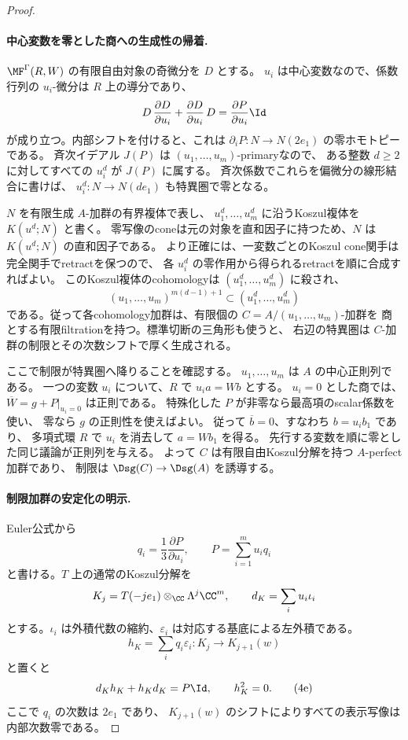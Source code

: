 \begin{proof}
 \paragraph{中心変数を零とした商への生成性の帰着.}
 \(\MF^\Gamma(R,W)\) の有限自由対象の奇微分を \(D\) とする。
 \(u_i\) は中心変数なので、係数行列の \(u_i\)-微分は \(R\) 上の導分であり、
 \[
 D\,\frac{\partial D}{\partial u_i}
 +\frac{\partial D}{\partial u_i}\,D
 =\frac{\partial P}{\partial u_i}\Id
 \]
 が成り立つ。内部シフトを付けると、これは
 \(\partial_iP:N\to N(2e_1)\) の零ホモトピーである。
 斉次イデアル \(J(P)\) は \((u_1,\ldots,u_m)\)-primaryなので、
 ある整数 \(d\ge2\) に対してすべての \(u_i^d\) が \(J(P)\) に属する。
 斉次係数でこれらを偏微分の線形結合に書けば、
 \(u_i^d:N\to N(de_1)\) も特異圏で零となる。

 \(N\) を有限生成 \(A\)-加群の有界複体で表し、
 \(u_1^d,\ldots,u_m^d\) に沿うKoszul複体を \(K(u^d;N)\) と書く。
 零写像のconeは元の対象を直和因子に持つため、\(N\) は
 \(K(u^d;N)\) の直和因子である。
 より正確には、一変数ごとのKoszul cone関手は完全関手でretractを保つので、
 各 \(u_i^d\) の零作用から得られるretractを順に合成すればよい。
 このKoszul複体のcohomologyは \((u_1^d,\ldots,u_m^d)\) に殺され、
 \[
 (u_1,\ldots,u_m)^{m(d-1)+1}\subset(u_1^d,\ldots,u_m^d)
 \]
 である。従って各cohomology加群は、有限個の \(C=A/(u_1,\ldots,u_m)\)-加群を
 商とする有限filtrationを持つ。標準切断の三角形も使うと、
 右辺の特異圏は \(C\)-加群の制限とその次数シフトで厚く生成される。

 ここで制限が特異圏へ降りることを確認する。
 \(u_1,\ldots,u_m\) は \(A\) の中心正則列である。
 一つの変数 \(u_i\) について、\(R\) で \(u_i a=Wb\) とする。
 \(u_i=0\) とした商では、\(\overline W=g+P|_{u_i=0}\) は正則である。
 特殊化した \(P\) が非零なら最高項のscalar係数を使い、
 零なら \(g\) の正則性を使えばよい。
 従って \(\overline b=0\)、すなわち \(b=u_i b_1\) であり、
 多項式環 \(R\) で \(u_i\) を消去して \(a=Wb_1\) を得る。
 先行する変数を順に零とした同じ議論が正則列を与える。
 よって \(C\) は有限自由Koszul分解を持つ \(A\)-perfect加群であり、
 制限は \(\Dsg(C)\to\Dsg(A)\) を誘導する。

 \paragraph{制限加群の安定化の明示.}
 Euler公式から
 \[
 q_i=\frac13\frac{\partial P}{\partial u_i},\qquad
 P=\sum_{i=1}^{m}u_iq_i
 \]
 と書ける。\(T\) 上の通常のKoszul分解を
 \[
 K_j=T(-je_1)\otimes_\CC\Lambda^j\CC^m,
 \qquad d_K=\sum_i u_i\iota_i
 \]
 とする。\(\iota_i\) は外積代数の縮約、\(\varepsilon_i\) は対応する基底による左外積である。
 \[
 h_K=\sum_iq_i\varepsilon_i:K_j\longrightarrow K_{j+1}(w)
 \]
 と置くと
 \[
 d_Kh_K+h_Kd_K=P\Id,\qquad h_K^2=0.                         \tag{4e}\label{eq:central-koszul}
 \]
 ここで \(q_i\) の次数は \(2e_1\) であり、
 \(K_{j+1}(w)\) のシフトによりすべての表示写像は内部次数零である。


\end{proof}
